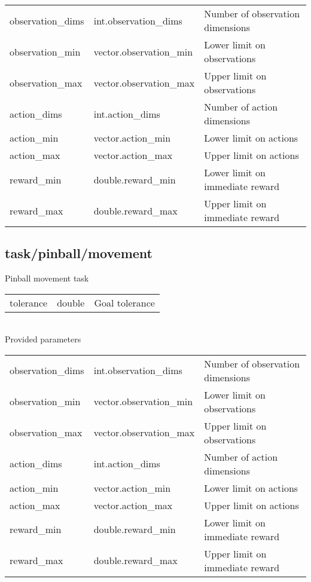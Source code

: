 \noindent\begin{tabular}{@{}lll@{}}
observation\_dims&int.observation\_dims&Number of observation dimensions\\
observation\_min&vector.observation\_min&Lower limit on observations\\
observation\_max&vector.observation\_max&Upper limit on observations\\
action\_dims&int.action\_dims&Number of action dimensions\\
action\_min&vector.action\_min&Lower limit on actions\\
action\_max&vector.action\_max&Upper limit on actions\\
reward\_min&double.reward\_min&Lower limit on immediate reward\\
reward\_max&double.reward\_max&Upper limit on immediate reward\\
\end{tabular}
\subsection{task/pinball/movement}
\noindent Pinball movement task\\

\noindent\begin{tabular}{@{}lll@{}}
tolerance&double&Goal tolerance\\
\end{tabular}
\\

\noindent Provided parameters\\

\noindent\begin{tabular}{@{}lll@{}}
observation\_dims&int.observation\_dims&Number of observation dimensions\\
observation\_min&vector.observation\_min&Lower limit on observations\\
observation\_max&vector.observation\_max&Upper limit on observations\\
action\_dims&int.action\_dims&Number of action dimensions\\
action\_min&vector.action\_min&Lower limit on actions\\
action\_max&vector.action\_max&Upper limit on actions\\
reward\_min&double.reward\_min&Lower limit on immediate reward\\
reward\_max&double.reward\_max&Upper limit on immediate reward\\
\end{tabular}
